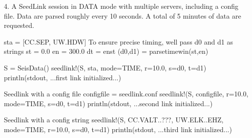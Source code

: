\documentclass[letterpaper,11pt,english]{sphinxmanual}
\begin{document}
4. A SeedLink session in DATA mode with multiple servers, including a config file. Data are parsed roughly every 10 seconds. A total of 5 minutes of data are requested.

\begin{sphinxVerbatim}[commandchars=\\\{\}]
sta = [\PYGZdq{}CC.SEP\PYGZdq{}, \PYGZdq{}UW.HDW\PYGZdq{}]
\PYGZsh{} To ensure precise timing, we\PYGZsq{}ll pass d0 and d1 as strings
st = 0.0
en = 300.0
dt = en\PYGZhy{}st
(d0,d1) = parsetimewin(st,en)

S = SeisData()
seedlink!(S, sta, mode=\PYGZdq{}TIME\PYGZdq{}, r=10.0, s=d0, t=d1)
println(stdout, \PYGZdq{}...first link initialized...\PYGZdq{})

\PYGZsh{} Seedlink with a config file
config\PYGZus{}file = \PYGZdq{}seedlink.conf\PYGZdq{}
seedlink!(S, config\PYGZus{}file, r=10.0, mode=\PYGZdq{}TIME\PYGZdq{}, s=d0, t=d1)
println(stdout, \PYGZdq{}...second link initialized...\PYGZdq{})

\PYGZsh{} Seedlink with a config string
seedlink!(S, \PYGZdq{}CC.VALT..???, UW.ELK..EHZ\PYGZdq{}, mode=\PYGZdq{}TIME\PYGZdq{}, r=10.0, s=d0, t=d1)
println(stdout, \PYGZdq{}...third link initialized...\PYGZdq{})
\end{sphinxVerbatim}



\renewcommand{\indexname}{Index}
\printindex
\end{document}
